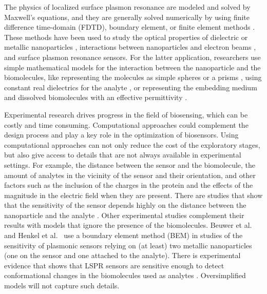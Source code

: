 The physics of localized surface plasmon resonance are modeled and solved by Maxwell's equations, and they are generally solved numerically 
by using finite difference time-domain (FDTD), boundary element, or finite element methods \cite{SolisTaboadaObelleiroLiz-MaarzanGarciadeabajo2014}.
These methods have been used to study the optical properties of dielectric or metallic nanoparticles \cite{Hohenester2018,HohenesterTrugler2012,
JungPedersenSondergaardPedersenLarsenNielsen2010, VideenSun2003,MayergoyzFredkinZhang2005, MayergoyzZhang2007}, interactions between nanoparticles
and electron beams \cite{GarciadeabajoAizpurua1997, GarciadeabajoHowie2002}, and surface plasmon resonance sensors. For the latter application, 
researchers use simple mathematical models for the interaction between the nanoparticle and the biomolecules, like representing the molecules as simple 
spheres \cite{DavisGomezVernon2010,AntosiewiczApellClaudioKall2011, SantiagoCordobaETal2011, ShenETal2013, UngerETal2009} or a prisms \cite{DanHu2014}, using 
constant real dielectrics for the analyte \cite{NghiemETal2012, SantiagoCordobaETal2011, ShenETal2013, UngerETal2009}, or representing the embedding medium 
and dissolved biomolecules with an effective permittivity \cite{JungCampbellChinowskyMarYee1998,WilletsVandyune2007,PhanETal2013}.

Experimental research drives progress in the field of biosensing, which can be costly and time consuming. Computational approaches could complement the design process and play a key role in the optimization of biosensors. Using computational approaches
can not only reduce the cost of the exploratory stages, but also give access to details that are not always available in experimental settings. For example, 
the distance between the sensor and the biomolecule, the amount of analytes in the vicinity of the sensor and their orientation, and other factors such as
the inclusion of the charges in the protein and the effects of the magnitude in the electric field when they are present. There are studies that show that 
the sensitivity of the sensor depends highly on the distance between the nanoparticle and the analyte \cite{HaesETal2004}. Other experimental studies complement
their results with models that ignore the presence of the biomolecules. Beuwer et al.~\cite{BeuwervanHoofZijlstra2018} and Henkel et al.~\cite{HenkelETal2018} 
use a boundary element method (BEM) in studies of the sensitivity of plasmonic sensors relying on (at least) two metallic nanoparticles 
(one on the sensor and one attached to the analyte). There is experimental evidence that shows that LSPR sensors are sensitive enough to detect conformational
changes in the biomolecules used as analytes \cite{HallETal2011}. Oversimplified models will not capture such details. 

